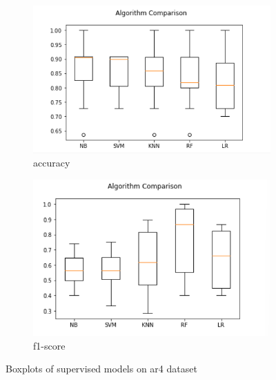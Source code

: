 \begin{figure}[h!]
  \centering
  \begin{subfigure}[b]{0.4\linewidth}
    \includegraphics[width=\linewidth]{report/ar4.png}
    \caption{accuracy}
  \end{subfigure}
  \begin{subfigure}[b]{0.4\linewidth}
    \includegraphics[width=\linewidth]{report/ar4_f.png}
    \caption{f1-score}
  \end{subfigure}
  \caption{Boxplots of supervised models on ar4 dataset}
\end{figure}

\pagebreak

